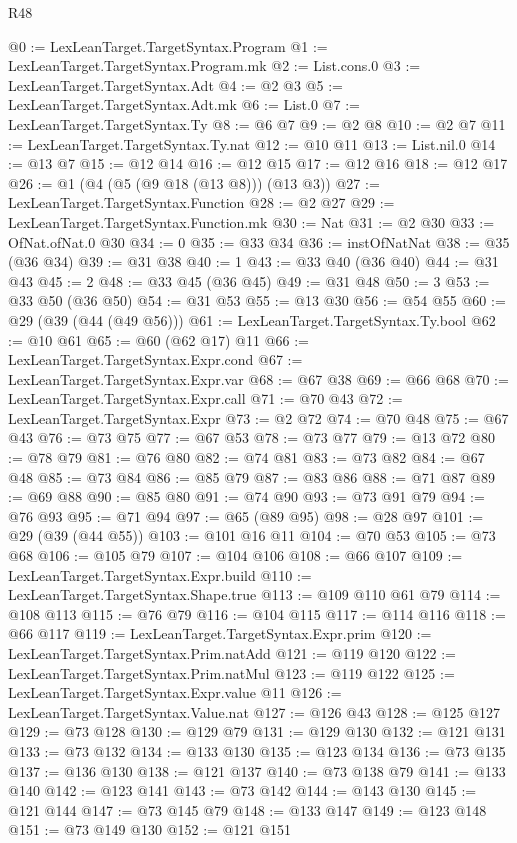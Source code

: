 \begin{lexlean}{R48}
\begin{coremodule}
@0 := LexLeanTarget.TargetSyntax.Program
@1 := LexLeanTarget.TargetSyntax.Program.mk
@2 := List.cons.{0}
@3 := LexLeanTarget.TargetSyntax.Adt
@4 := @2 @3
@5 := LexLeanTarget.TargetSyntax.Adt.mk
@6 := List.{0}
@7 := LexLeanTarget.TargetSyntax.Ty
@8 := @6 @7
@9 := @2 @8
@10 := @2 @7
@11 := LexLeanTarget.TargetSyntax.Ty.nat
@12 := @10 @11
@13 := List.nil.{0}
@14 := @13 @7
@15 := @12 @14
@16 := @12 @15
@17 := @12 @16
@18 := @12 @17
@26 := @1 (@4 (@5 (@9 @18 (@13 @8))) (@13 @3))
@27 := LexLeanTarget.TargetSyntax.Function
@28 := @2 @27
@29 := LexLeanTarget.TargetSyntax.Function.mk
@30 := Nat
@31 := @2 @30
@33 := OfNat.ofNat.{0} @30
@34 := 0
@35 := @33 @34
@36 := instOfNatNat
@38 := @35 (@36 @34)
@39 := @31 @38
@40 := 1
@43 := @33 @40 (@36 @40)
@44 := @31 @43
@45 := 2
@48 := @33 @45 (@36 @45)
@49 := @31 @48
@50 := 3
@53 := @33 @50 (@36 @50)
@54 := @31 @53
@55 := @13 @30
@56 := @54 @55
@60 := @29 (@39 (@44 (@49 @56)))
@61 := LexLeanTarget.TargetSyntax.Ty.bool
@62 := @10 @61
@65 := @60 (@62 @17) @11
@66 := LexLeanTarget.TargetSyntax.Expr.cond
@67 := LexLeanTarget.TargetSyntax.Expr.var
@68 := @67 @38
@69 := @66 @68
@70 := LexLeanTarget.TargetSyntax.Expr.call
@71 := @70 @43
@72 := LexLeanTarget.TargetSyntax.Expr
@73 := @2 @72
@74 := @70 @48
@75 := @67 @43
@76 := @73 @75
@77 := @67 @53
@78 := @73 @77
@79 := @13 @72
@80 := @78 @79
@81 := @76 @80
@82 := @74 @81
@83 := @73 @82
@84 := @67 @48
@85 := @73 @84
@86 := @85 @79
@87 := @83 @86
@88 := @71 @87
@89 := @69 @88
@90 := @85 @80
@91 := @74 @90
@93 := @73 @91 @79
@94 := @76 @93
@95 := @71 @94
@97 := @65 (@89 @95)
@98 := @28 @97
@101 := @29 (@39 (@44 @55))
@103 := @101 @16 @11
@104 := @70 @53
@105 := @73 @68
@106 := @105 @79
@107 := @104 @106
@108 := @66 @107
@109 := LexLeanTarget.TargetSyntax.Expr.build
@110 := LexLeanTarget.TargetSyntax.Shape.true
@113 := @109 @110 @61 @79
@114 := @108 @113
@115 := @76 @79
@116 := @104 @115
@117 := @114 @116
@118 := @66 @117
@119 := LexLeanTarget.TargetSyntax.Expr.prim
@120 := LexLeanTarget.TargetSyntax.Prim.natAdd
@121 := @119 @120
@122 := LexLeanTarget.TargetSyntax.Prim.natMul
@123 := @119 @122
@125 := LexLeanTarget.TargetSyntax.Expr.value @11
@126 := LexLeanTarget.TargetSyntax.Value.nat
@127 := @126 @43
@128 := @125 @127
@129 := @73 @128
@130 := @129 @79
@131 := @129 @130
@132 := @121 @131
@133 := @73 @132
@134 := @133 @130
@135 := @123 @134
@136 := @73 @135
@137 := @136 @130
@138 := @121 @137
@140 := @73 @138 @79
@141 := @133 @140
@142 := @123 @141
@143 := @73 @142
@144 := @143 @130
@145 := @121 @144
@147 := @73 @145 @79
@148 := @133 @147
@149 := @123 @148
@151 := @73 @149 @130
@152 := @121 @151

\end{coremodule}
\end{lexlean}
